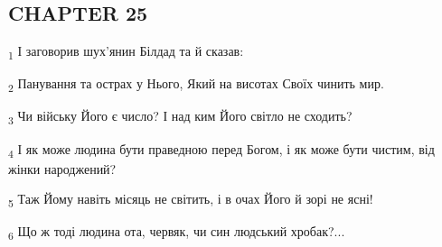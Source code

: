 \subsection{CHAPTER 25}
\begin{tcolorbox}
\textsubscript{1} І заговорив шух'янин Білдад та й сказав:
\end{tcolorbox}
\begin{tcolorbox}
\textsubscript{2} Панування та острах у Нього, Який на висотах Своїх чинить мир.
\end{tcolorbox}
\begin{tcolorbox}
\textsubscript{3} Чи війську Його є число? І над ким Його світло не сходить?
\end{tcolorbox}
\begin{tcolorbox}
\textsubscript{4} І як може людина бути праведною перед Богом, і як може бути чистим, від жінки народжений?
\end{tcolorbox}
\begin{tcolorbox}
\textsubscript{5} Таж Йому навіть місяць не світить, і в очах Його й зорі не ясні!
\end{tcolorbox}
\begin{tcolorbox}
\textsubscript{6} Що ж тоді людина ота, червяк, чи син людський хробак?...
\end{tcolorbox}
